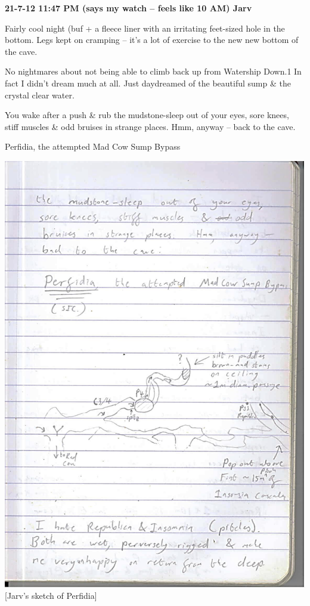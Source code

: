 \textbf{21-7-12 11:47 PM (says my watch -- feels like 10 AM) Jarv}

Fairly cool night (buf + a fleece liner with an irritating feet-sized
hole in the bottom. Legs kept on cramping -- it's a lot of exercise to
the new new bottom of the cave.

No nightmares about not being able to climb back up from Watership
Down.1 In fact I didn't dream much at all. Just daydreamed of the
beautiful sump \& the crystal clear water.

You wake after a push \& rub the mudstone-sleep out of your eyes, sore
knees, stiff muscles \& odd bruises in strange places. Hmm, anyway --
back to the cave.

Perfidia, the attempted Mad Cow Sump Bypass

\includegraphics{UgLog1012/64.jpeg}\\
{[}Jarv's sketch of Perfidia{]}

